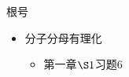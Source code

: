 \documentclass{article}
\begin{document}
\begin{zremark}
  根号
\end{zremark}

\begin{itemize}
  \item 分子分母有理化
        \begin{itemize}
          \item 第一章$\S 1$习题6
        \end{itemize}
\end{itemize}
\end{document}
